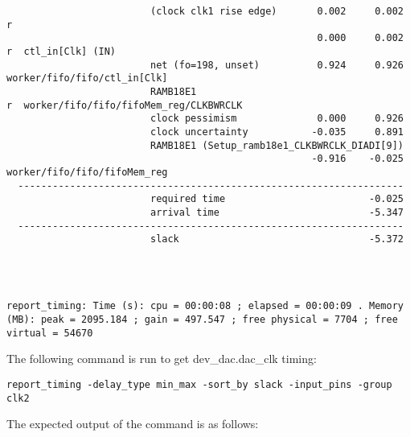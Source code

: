 \begin{lstlisting}
                         (clock clk1 rise edge)       0.002     0.002 r
                                                      0.000     0.002 r  ctl_in[Clk] (IN)
                         net (fo=198, unset)          0.924     0.926    worker/fifo/fifo/ctl_in[Clk]
                         RAMB18E1                                     r  worker/fifo/fifo/fifoMem_reg/CLKBWRCLK
                         clock pessimism              0.000     0.926
                         clock uncertainty           -0.035     0.891
                         RAMB18E1 (Setup_ramb18e1_CLKBWRCLK_DIADI[9])
                                                     -0.916    -0.025    worker/fifo/fifo/fifoMem_reg
  -------------------------------------------------------------------
                         required time                         -0.025
                         arrival time                          -5.347
  -------------------------------------------------------------------
                         slack                                 -5.372




report_timing: Time (s): cpu = 00:00:08 ; elapsed = 00:00:09 . Memory (MB): peak = 2095.184 ; gain = 497.547 ; free physical = 7704 ; free virtual = 54670
\end{lstlisting}
\fontsize{10}{12}\selectfont
The following command is run to get dev\_dac.dac\_clk timing:
\begin{lstlisting}
report_timing -delay_type min_max -sort_by slack -input_pins -group clk2
\end{lstlisting}
The expected output of the command is as follows:
\fontsize{6}{12}\selectfont
